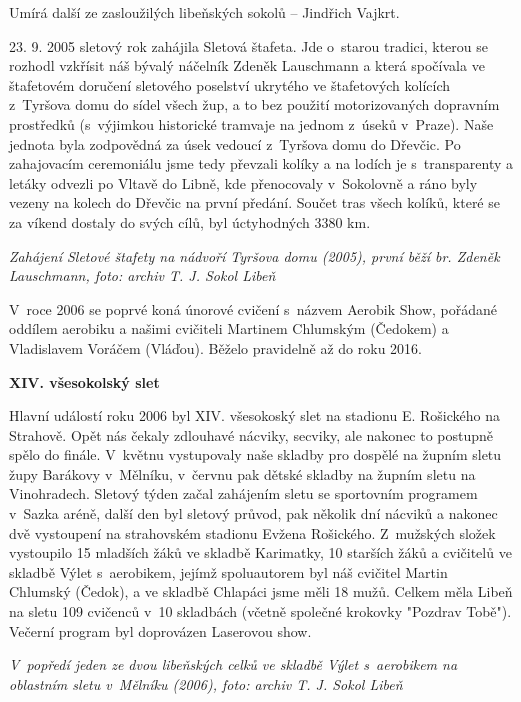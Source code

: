 \documentclass[a5paper, 12pt, twoside]{article}
\begin{document}
Umírá další ze zasloužilých libeňských sokolů -- Jindřich Vajkrt.

23. 9. 2005 sletový rok zahájila Sletová štafeta. Jde o~starou tradici,
kterou se rozhodl vzkřísit náš bývalý náčelník Zdeněk Lauschmann a která
spočívala ve štafetovém doručení sletového poselství ukrytého ve
štafetových kolících z~Tyršova domu do sídel všech žup, a to bez použití
motorizovaných dopravním prostředků (s~výjimkou historické tramvaje na
jednom z~úseků v~Praze). Naše jednota byla zodpovědná za úsek vedoucí
z~Tyršova domu do Dřevčic. Po zahajovacím ceremoniálu jsme tedy převzali
kolíky a na lodích je s~transparenty a letáky odvezli po Vltavě do
Libně, kde přenocovaly v~Sokolovně a ráno byly vezeny na kolech do
Dřevčic na první předání. Součet tras všech kolíků, které se za víkend
dostaly do svých cílů, byl úctyhodných 3380 km.


\textit{Zahájení Sletové štafety na nádvoří Tyršova domu (2005), první
běží br. Zdeněk Lauschmann, foto: archiv T. J. Sokol Libeň}

V~roce 2006 se poprvé koná únorové cvičení s~názvem Aerobik Show,
pořádané oddílem aerobiku a našimi cvičiteli Martinem Chlumským
(Čedokem) a Vladislavem Voráčem (Vláďou). Běželo pravidelně až do roku
2016.

\textbf{XIV. všesokolský slet}

Hlavní událostí roku 2006 byl XIV. všesokoský slet na stadionu E.
Rošického na Strahově. Opět nás čekaly zdlouhavé nácviky, secviky, ale
nakonec to postupně spělo do finále. V~květnu vystupovaly naše skladby
pro dospělé na župním sletu župy Barákovy v~Mělníku, v~červnu pak dětské
skladby na župním sletu na Vinohradech. Sletový týden začal zahájením
sletu se sportovním programem v~Sazka aréně, další den byl sletový
průvod, pak několik dní nácviků a nakonec dvě vystoupení na strahovském
stadionu Evžena Rošického. Z~mužských složek vystoupilo 15 mladších žáků
ve skladbě Karimatky, 10 starších žáků a cvičitelů ve skladbě Výlet
s~aerobikem, jejímž spoluautorem byl náš cvičitel Martin Chlumský (Čedok),
a ve skladbě Chlapáci jsme měli 18 mužů. Celkem měla Libeň na sletu 109
cvičenců v~10 skladbách (včetně společné krokovky "Pozdrav Tobě").
Večerní program byl doprovázen Laserovou show.


\textit{V~popředí jeden ze dvou libeňských celků ve skladbě Výlet
s~aerobikem na oblastním sletu v~Mělníku (2006), foto: archiv T. J. Sokol
Libeň}
\end{document}
